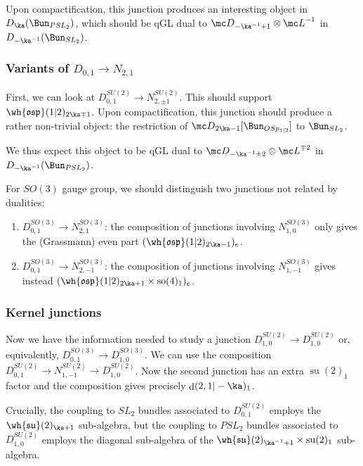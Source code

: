 \documentclass[11pt,reqno]{amsart}
\theoremstyle{plain}
\numberwithin{equation}{section}
\DeclareMathOperator{\td}{d}
\DeclareMathOperator{\tsu}{su}
\DeclareMathOperator{\tso}{so}
\theoremstyle{definition}
\begin{document}
Upon compactification, this junction produces an interesting object in $D_{\ka}(\Bun_{PSL_2})$,
which should be qGL dual to ${\mc D}_{-\ka^{-1}+1} \otimes {\mc L}^{-1}$ in $D_{-\ka^{-1}}(\Bun_{SL_2})$.

\subsubsection{Variants of $D_{0,1} \to N_{2,1}$}

First, we can look at $D^{SU(2)}_{0,1} \to N^{SU(2)}_{2,\pm 1}$. This
should support $\wh{\mathfrak{osp}}(1|2)_{2\ka \mp 1}$. Upon compactification, 
this junction should produce a rather non-trivial object: the restriction of ${\mc
  D}_{2\ka-1}[\Bun_{OSp_{1|2}}]$ to $\Bun_{SL_2}$.

We thus expect this object to be qGL dual to ${\mc D}_{-\ka^{-1}\pm 2}
\otimes {\mc L}^{\mp 2}$ in $D_{-\ka^{-1}}(\Bun_{PSL_2})$.

For $SO(3)$ gauge group, we should distinguish two junctions not related by dualities:
\begin{enumerate}
\item $D^{SO(3)}_{0,1} \to N^{SO(3)}_{2,1}$: the composition of junctions involving $N^{SO(3)}_{1,0}$
only gives the (Grassmann) even part $(\wh{\mathfrak{osp}}(1|2)_{2\ka - 1})_e$.
\item $D^{SO(3)}_{0,1} \to N^{SO(3)}_{2,-1}$: the composition of junctions involving $N^{SO(3)}_{1,-1}$
gives instead $(\wh{\mathfrak{osp}}(1|2)_{2\ka +1} \times \tso(4)_1)_e$.
\end{enumerate}

\subsubsection{Kernel junctions}
Now we have the information needed to study a junction
$D^{SU(2)}_{1,0} \to D^{SU(2)}_{1,0}$ or, equivalently,
$D^{SO(3)}_{0,1} \to D^{SO(3)}_{1,0}$. We can use the composition
$D_{0,1}^{SU(2)} \to N_{1,-1}^{SU(2)} \to D_{1,0}^{SU(2)}$. Now the
second junction has an extra $\tsu(2)_1$ factor and the composition
gives precisely $\td(2,1|-\ka)_1$.

Crucially, the coupling to $SL_2$ bundles associated to
$D_{0,1}^{SU(2)}$ employs the $\wh{\mathfrak{su}}(2)_{\ka+1}$
sub-algebra, but the coupling to $PSL_2$ bundles associated to
$D_{1,0}^{SU(2)}$ employs the diagonal sub-algebra of the
$\wh{\mathfrak{su}}(2)_{\ka^{-1}+1} \times \tsu(2)_1$ sub-algebra.
\end{document}
